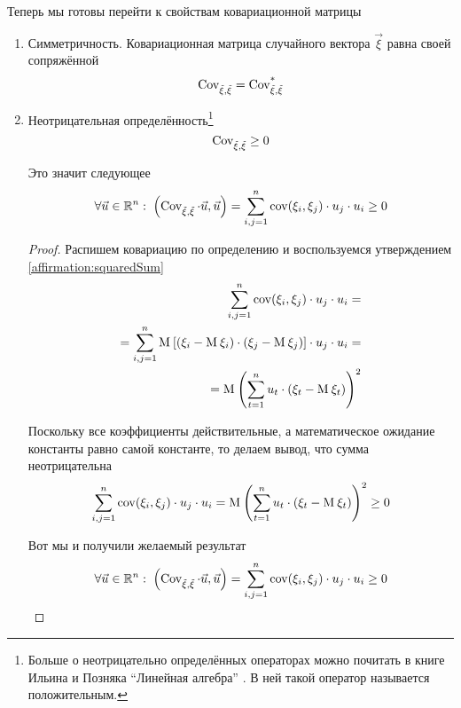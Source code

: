 Теперь мы готовы перейти к свойствам ковариационной матрицы
\begin{enumerate}
  \item Симметричность. Ковариационная матрица случайного вектора $\vec{\xi}$
      равна своей сопряжённой
      $$\operatorname{Cov^{}_{\vec{\xi}, \vec{\xi}}} = \operatorname{Cov^{*}_{\vec{\xi}, \vec{\xi}}}$$
  \item Неотрицательная определённость\footnote{Больше о неотрицательно
      определённых операторах можно почитать в книге Ильина и Позняка
      ``Линейная алгебра'' \cite[с.~139]{IlinPoznyarLA}.
      В ней такой оператор называется положительным.}
      $$\operatorname{Cov^{}_{\vec{\xi}, \vec{\xi}}} \ge 0$$

      Это значит следующее
      $$\forall \vec{u} \in \mathbb{R}^n:\;
      \left( \operatorname{Cov^{}_{\vec{\xi}, \vec{\xi}}} \cdot \vec{u}, \vec{u} \right)
      = \sum_{i,j=1}^{n} \operatorname{cov}\!\left( \xi_i, \xi_j \right) \cdot u_j \cdot u_i
      \ge 0$$

      \begin{proof}
      Распишем ковариацию по определению и воспользуемся утверждением
      \ref{affirmation:squaredSum}
      \begin{align*}
          \sum_{i,j=1}^{n} \operatorname{cov}\!\left( \xi_i, \xi_j \right) \cdot u_j \cdot u_i = \\
          = \sum_{i,j=1}^{n} \operatorname{M}_{} \left[ \left( \xi_i - \operatorname{M}_{} \xi_i \right)
            \cdot \left( \xi_j - \operatorname{M}_{} \xi_j \right) \right]
            \cdot u_j \cdot u_i = \\
          = \operatorname{M}_{} \left( \sum_{t=1}^{n} u_t
        \cdot \left( \xi_t - \operatorname{M}_{} \xi_t \right) \right)^2
      \end{align*}

      Поскольку все коэффициенты действительные, а математическое
      ожидание константы равно самой константе, то делаем вывод,
      что сумма неотрицательна
      $$\sum_{i,j=1}^{n} \operatorname{cov}\!\left( \xi_i, \xi_j \right) \cdot u_j \cdot u_i
          = \operatorname{M}_{} \left( \sum_{t=1}^{n} u_t
        \cdot \left( \xi_t - \operatorname{M}_{} \xi_t \right) \right)^2
          \ge 0$$

      Вот мы и получили желаемый результат
      $$\forall \vec{u} \in \mathbb{R}^n:\;
          \left( \operatorname{Cov^{}_{\vec{\xi}, \vec{\xi}}} \cdot \vec{u}, \vec{u} \right)
          = \sum_{i,j=1}^{n} \operatorname{cov}\!\left( \xi_i, \xi_j \right) \cdot u_j \cdot u_i
          \ge 0$$
      \end{proof}
\end{enumerate}

